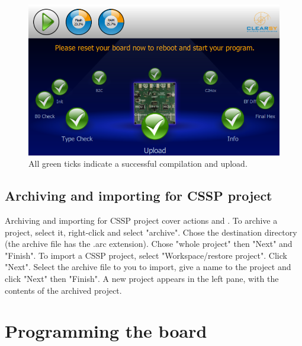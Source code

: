       \begin{figure}[h]
\centering\includegraphics[scale=0.3]{Pictures/chapterProgramming/runner-upload-completed.png}
\caption{All green ticks indicate a successful compilation and upload.}
\label{programming:runner-upload-completed}
\end{figure}  

\subsection{Archiving and importing for CSSP project}

Archiving and importing for CSSP project cover actions  and . To archive a project, select it, right-click and select "archive". Chose the destination directory (the archive file has the .arc extension). Chose "whole project" then "Next" and "Finish".
To import a CSSP project, select "Workspace/restore project". Click "Next". Select the archive file to you to import, give a name to the project and click "Next" then "Finish". A new project appears in the left pane, with the contents of the archived project.

\section{Programming the board}

